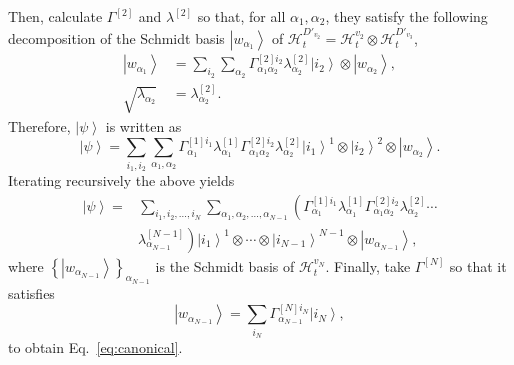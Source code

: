 \documentclass[preprintnumbers,aps,amsmath,amssymb,pra,twocolumn,showpacs,superscriptaddress,floatfix]{revtex4-1}
\def\Ket#1{\left|#1\right\rangle}
\theoremstyle{plain}
\theoremstyle{definition}
\theoremstyle{remark}
\begin{document}
Then, calculate $\Gamma^{[2]}$ and $\lambda^{[2]}$ so that, for all $\alpha_1, \alpha_2$, they satisfy the following decomposition of the Schmidt basis $\Ket{w_{\alpha_1}}$ of $\mathcal{H}^{D'_{v_2}}_t=\mathcal{H}^{v_2}_t\otimes\mathcal{H}^{D'_{v_3}}_t$,
\begin{align*}
    \Ket{w_{\alpha_1}} &= \sum_{i_2}\sum_{\alpha_2}\Gamma_{\alpha_1 \alpha_2}^{[2]i_2}\lambda_{\alpha_2}^{[2]}\Ket{i_2}\otimes\Ket{w_{\alpha_2}},\\
    \sqrt{\lambda_{\alpha_2}} &= \lambda_{\alpha_2}^{[2]}.
\end{align*}
Therefore, $\Ket\psi$ is written as
\[
    \Ket\psi = \sum_{i_1,i_2}\sum_{\alpha_1,\alpha_2}\Gamma_{\alpha_1}^{[1]i_1}\lambda_{\alpha_1}^{[1]}\Gamma_{\alpha_1 \alpha_2}^{[2]i_2}\lambda_{\alpha_2}^{[2]}\Ket{i_1}^{1}\otimes\Ket{i_2}^{2}\otimes\Ket{w_{\alpha_2}}.
\]
Iterating recursively the above yields
\begin{equation*}
    \begin{split}
        \Ket\psi =& \sum_{i_1,i_2,\ldots,i_N}\sum_{\alpha_1,\alpha_2,\ldots,\alpha_{N-1}}
        \left(\Gamma_{\alpha_1}^{[1]i_1}\lambda_{\alpha_1}^{[1]}\Gamma_{\alpha_1 \alpha_2}^{[2]i_2}\lambda_{\alpha_2}^{[2]}\cdots\right.\\
        &\left.\lambda_{\alpha_{N-1}}^{[N-1]}\right)\Ket{i_1}^{1}\otimes\cdots\otimes\Ket{i_{N-1}}^{N-1}\otimes\Ket{w_{\alpha_{N-1}}},
    \end{split}
\end{equation*}
where ${\left\{\Ket{w_{\alpha_{N-1}}}\right\}}_{\alpha_{N-1}}$ is the Schmidt basis of $\mathcal{H}^{v_N}_t$.
Finally, take $\Gamma^{[N]}$ so that it satisfies
\[
    \Ket{w_{\alpha_{N-1}}}=\sum_{i_N}\Gamma_{\alpha_{N-1}}^{[N]i_N}\Ket{i_N},
\]
to obtain Eq.~\eqref{eq:canonical}.
\end{document}
